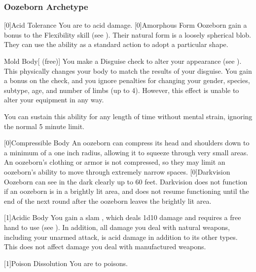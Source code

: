         \subsubsection{Oozeborn Archetype}
            [0]{Acid Tolerance} You are  to acid damage.
            [0]{Amorphous Form} Oozeborn gain a  bonus to the Flexibility skill (see ).
                Their natural form is a loosely spherical blob.
                They can use the  ability as a standard action to adopt a particular shape.
                \begin{durationability}{Mold Body}[ (free)]
                    You make a Disguise check to alter your appearance (see ).
                    This physically changes your body to match the results of your disguise.
                    You gain a  bonus on the check, and you ignore penalties for changing your gender, species, subtype, age, and number of limbs (up to 4).
                    However, this effect is unable to alter your equipment in any way.

                    You can sustain this ability for any length of time without mental strain, ignoring the normal 5 minute limit.
                \end{durationability}
            [0]{Compressible Body} An oozeborn can compress its head and shoulders down to a minimum of a one inch radius, allowing it to squeeze through very small areas.
                An oozeborn's clothing or armor is not compressed, so they may limit an oozeborn's ability to move through extremely narrow spaces.
            [0]{Darkvision} Oozeborn can see in the dark clearly up to 60 feet.
                Darkvision does not function if an oozeborn is in a brightly lit area, and does not resume functioning until the end of the next round after the oozeborn leaves the brightly lit area.

            [1]{Acidic Body} You gain a slam , which deals 1d10 damage and requires a free hand to use (see ).
            In addition, all damage you deal with natural weapons, including your unarmed attack, is acid damage in addition to its other types.
            This does not affect damage you deal with manufactured weapons.

            [1]{Poison Dissolution} You are  to poisons.

